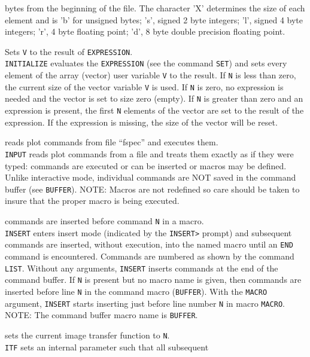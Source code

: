 	bytes from the beginning of the file.  The character 'X' determines
	the size of each element and is 'b' for unsigned bytes; 's',
	signed 2 byte integers; 'l', signed 4 byte integers; 'r', 4 byte
	floating point; 'd', 8 byte double precision floating point.
\item [{\tt INITIALIZE V N EXPRESSION } --] Sets {\tt V} to the result of {\tt EXPRESSION}.\\
	{\tt INITIALIZE} evaluates the {\tt EXPRESSION}
	(see the command {\tt SET}) and sets
	every element of the array (vector) user variable {\tt V}
	to the result.  If {\tt N} is less than zero, the current
	size of the vector variable {\tt V} is used.  If
	{\tt N} is zero, no expression is needed and the vector
	is set to size zero (empty).  If {\tt N} is greater than
	zero and an expression is present, the first {\tt N}
	elements of the vector are set to the result of the expression.
	If the expression is missing, the size of the vector will be reset.
\item [{\tt INPUT fspec } --] reads plot commands from file ``fspec'' and executes them.\\
	{\tt INPUT} reads plot commands from a file and treats
	them exactly as if they were typed:  commands are executed or
	can be inserted or macros may be defined.  Unlike interactive
	mode, individual commands are NOT saved in the command buffer
	(see {\tt BUFFER}).
	NOTE: Macros are not redefined so care should be taken to
	insure that the proper macro is being executed.
\item [{\tt INSERT [N [macro]] } --] commands are inserted before command {\tt N} in a macro.\\
	{\tt INSERT} enters insert mode (indicated by the
	{\tt INSERT}\verb+>+ prompt) and
	subsequent commands are inserted, without execution, into the
	named macro until an {\tt END} command
	is encountered.  Commands are numbered as shown by the command
	{\tt LIST}.  Without any arguments,
	{\tt INSERT} inserts commands at the end of the command
	buffer.  If {\tt N} is present but no macro name is given,
	then commands are inserted before line {\tt N} in the
	command macro ({\tt BUFFER}).  With
	the {\tt MACRO} argument, {\tt INSERT} starts
	inserting just before line number {\tt N} in macro
	{\tt MACRO}.
	NOTE: The command buffer macro name is
	{\tt BUFFER}.
\item [{\tt ITF N } --] sets the current image transfer function to {\tt N}.\\
	{\tt ITF} sets an internal parameter such that all subsequent
